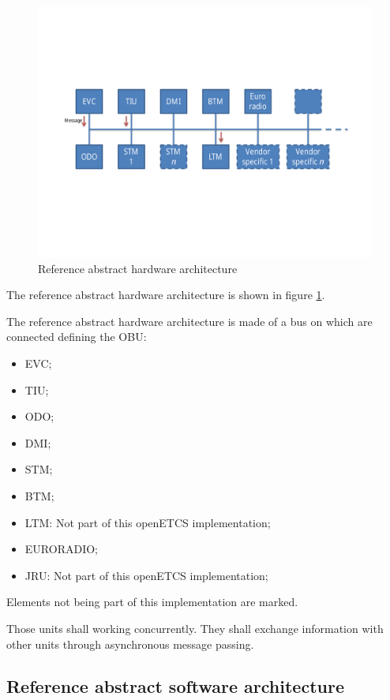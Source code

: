 \documentclass{template/openetcs_report}
\begin{document}
\begin{figure}
  \centering
  \includegraphics[width=\linewidth]{abstract-hardware-architecture.pdf}
  \caption{Reference abstract hardware architecture}
  \label{fig:hardware-arch}
\end{figure}

The reference abstract hardware architecture is shown in figure
\ref{fig:hardware-arch}.

The reference abstract hardware architecture is made of a bus on which
are connected  defining the \gls{OBU}:

\begin{itemize}
\item \gls{EVC};
\item \gls{TIU};
\item \gls{ODO};
\item \gls{DMI};
\item \gls{STM};
\item \gls{BTM};
\item \gls{LTM}: Not part of this openETCS implementation;
\item EURORADIO;
\item \gls{JRU}: Not part of this openETCS implementation;
\end{itemize}

Elements not being part of this implementation are marked. 

Those units shall working concurrently. They shall exchange
information with other units through asynchronous message passing.

\subsection{Reference abstract software architecture}
\label{software-arch}
\end{document}
